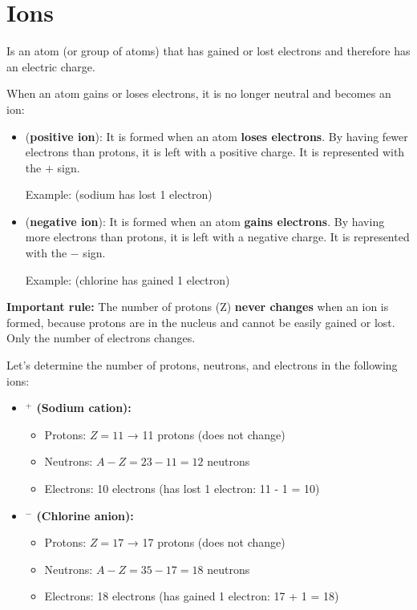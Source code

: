 \section{Ions}
\begin{definition}[ion]
    Is an atom (or group of atoms) that has gained or lost electrons and therefore has an electric charge.
\end{definition}
When an atom gains or loses electrons, it is no longer neutral and becomes an ion:
\begin{itemize}
    \item {} (\textbf{positive ion}): It is formed when an atom \textbf{loses electrons}. By having fewer electrons than protons, it is left with a positive charge. It is represented with the \( + \) sign.

    Example:  (sodium has lost 1 electron)

    \item {} (\textbf{negative ion}): It is formed when an atom \textbf{gains electrons}. By having more electrons than protons, it is left with a negative charge. It is represented with the \( - \) sign.

    Example:  (chlorine has gained 1 electron)
\end{itemize}
\begin{remark}
    \textbf{Important rule:} The number of protons (Z) \textbf{never changes} when an ion is formed, because protons are in the nucleus and cannot be easily gained or lost. Only the number of electrons changes.
\end{remark}
\begin{example}
    Let's determine the number of protons, neutrons, and electrons in the following ions:

    \begin{itemize}
        \item \textbf{$^{+}$ (Sodium cation):}
        \begin{itemize}
            \item Protons: \( Z = 11 \) → 11 protons (does not change)
            \item Neutrons: \( A - Z = 23 - 11 = 12 \) neutrons
            \item Electrons: 10 electrons (has lost 1 electron: 11 - 1 = 10)
        \end{itemize}

        \item \textbf{$^{-}$ (Chlorine anion):}
        \begin{itemize}
            \item Protons: \( Z = 17 \) → 17 protons (does not change)
            \item Neutrons: \( A - Z = 35 - 17 = 18 \) neutrons
            \item Electrons: 18 electrons (has gained 1 electron: 17 + 1 = 18)
        \end{itemize}
    \end{itemize}
\end{example}
